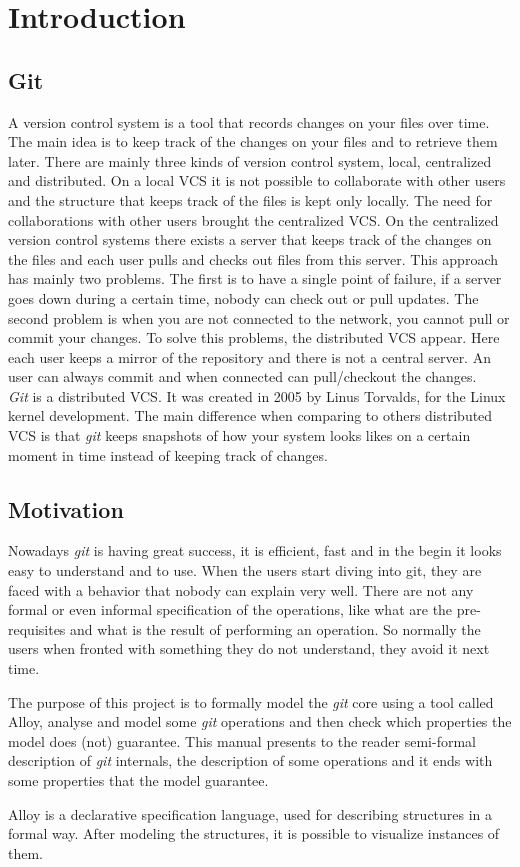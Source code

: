 \section{Introduction}
\subsection{Git}
A version control system is a tool that records changes on your
files over time. The main idea is to keep track of the changes on your
files and to retrieve them later. There are mainly three kinds of 
version control system, local, centralized and distributed. On
a local VCS it is not possible to collaborate with other users and
the structure that keeps track of the files is kept only locally. The
need for collaborations with other users brought the centralized VCS.
On the centralized version control systems there exists a server that keeps
track of the changes on the files and each user pulls and checks out files
from this server. This approach has mainly two problems. The
first is to have a single point of failure, if a server goes down
during a certain time, nobody can check out or pull updates. The
second problem is when you are not connected to the network, you
cannot pull or commit your changes. To solve this problems, the
distributed VCS appear. Here each user keeps a mirror of the
repository and there is not a central server. An user can always commit
and when connected can pull/checkout the changes.\\

\emph{Git} is a distributed VCS. It was created in 2005 by Linus Torvalds,
for the Linux kernel development. The main difference when comparing to
others distributed VCS is that \emph{git} keeps snapshots of how your system
looks likes on a certain moment in time instead of keeping track of
changes.\par
\subsection{Motivation}
Nowadays \emph{git} is having great success, it is efficient, fast and
in the begin it looks easy to understand and to use. When
the users start diving into git, they are faced with a behavior that
nobody can explain very well. There are not any formal or even informal
specification of the operations, like what are the pre-requisites and
what is the result of performing an operation. So normally the users
when fronted with something they do not understand, they avoid it next
time.\par
The purpose of this project is to
formally model the \emph{git} core using a tool called 
Alloy, analyse and model some \emph{git}
operations and then check which properties the model does (not)
guarantee. This manual presents to the reader semi-formal description of
\emph{git} internals, the description of some operations and it ends with
some properties that the model guarantee.\par
Alloy is a declarative specification language, used for describing structures in 
a formal way. After modeling the structures, it is possible to visualize 
instances of them. \\

